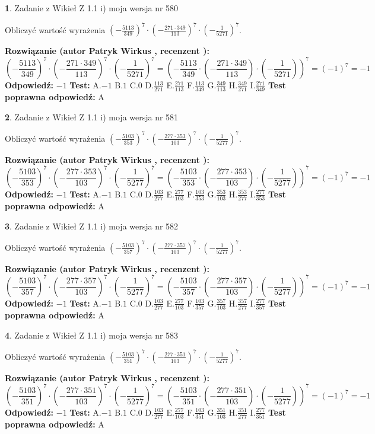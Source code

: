\documentclass[12pt, a4paper]{article}
\theoremstyle{definition} %
\newtheorem{zad}{}
\newcommand{\zadStart}[1]{\begin{zad}#1\newline}
\newcommand{\zadStop}{\end{zad}}
\newcommand{\rozwStart}[2]{\noindent \textbf{Rozwiązanie (autor #1 , recenzent #2): }\newline}
\newcommand{\rozwStop}{\newline}
\newcommand{\odpStart}{\noindent \textbf{Odpowiedź:}\newline}
\newcommand{\odpStop}{\newline}
\newcommand{\testStart}{\noindent \textbf{Test:}\newline}
\newcommand{\testStop}{\newline}
\newcommand{\kluczStart}{\noindent \textbf{Test poprawna odpowiedź:}\newline}
\newcommand{\kluczStop}{\newline}
\begin{document}
\zadStart{Zadanie z Wikieł Z 1.1 i) moja wersja nr 580}

Obliczyć wartość wyrażenia $(-\frac{5113}{349})^{7} \cdot (-\frac{271 \cdot 349}{113})^{7} \cdot (-\frac{1}{5271})^{7}$.
\zadStop
\rozwStart{Patryk Wirkus}{}
$$(-\frac{5113}{349})^{7} \cdot (-\frac{271 \cdot 349}{113})^{7} \cdot (-\frac{1}{5271})^{7} = (-\frac{5113}{349} \cdot (-\frac{271 \cdot 349}{113}) \cdot (-\frac{1}{5271}))^{7} = (-1)^{7} = -1$$
\rozwStop
\odpStart
$-1$
\odpStop
\testStart
A.$-1$ B.$1$ C.$0$ D.$\frac{113}{271}$ E.$\frac{271}{113}$
F.$\frac{113}{349}$ G.$\frac{349}{113}$
H.$\frac{349}{271}$
I.$\frac{271}{349}$
\testStop
\kluczStart
A
\kluczStop



\zadStart{Zadanie z Wikieł Z 1.1 i) moja wersja nr 581}

Obliczyć wartość wyrażenia $(-\frac{5103}{353})^{7} \cdot (-\frac{277 \cdot 353}{103})^{7} \cdot (-\frac{1}{5277})^{7}$.
\zadStop
\rozwStart{Patryk Wirkus}{}
$$(-\frac{5103}{353})^{7} \cdot (-\frac{277 \cdot 353}{103})^{7} \cdot (-\frac{1}{5277})^{7} = (-\frac{5103}{353} \cdot (-\frac{277 \cdot 353}{103}) \cdot (-\frac{1}{5277}))^{7} = (-1)^{7} = -1$$
\rozwStop
\odpStart
$-1$
\odpStop
\testStart
A.$-1$ B.$1$ C.$0$ D.$\frac{103}{277}$ E.$\frac{277}{103}$
F.$\frac{103}{353}$ G.$\frac{353}{103}$
H.$\frac{353}{277}$
I.$\frac{277}{353}$
\testStop
\kluczStart
A
\kluczStop



\zadStart{Zadanie z Wikieł Z 1.1 i) moja wersja nr 582}

Obliczyć wartość wyrażenia $(-\frac{5103}{357})^{7} \cdot (-\frac{277 \cdot 357}{103})^{7} \cdot (-\frac{1}{5277})^{7}$.
\zadStop
\rozwStart{Patryk Wirkus}{}
$$(-\frac{5103}{357})^{7} \cdot (-\frac{277 \cdot 357}{103})^{7} \cdot (-\frac{1}{5277})^{7} = (-\frac{5103}{357} \cdot (-\frac{277 \cdot 357}{103}) \cdot (-\frac{1}{5277}))^{7} = (-1)^{7} = -1$$
\rozwStop
\odpStart
$-1$
\odpStop
\testStart
A.$-1$ B.$1$ C.$0$ D.$\frac{103}{277}$ E.$\frac{277}{103}$
F.$\frac{103}{357}$ G.$\frac{357}{103}$
H.$\frac{357}{277}$
I.$\frac{277}{357}$
\testStop
\kluczStart
A
\kluczStop



\zadStart{Zadanie z Wikieł Z 1.1 i) moja wersja nr 583}

Obliczyć wartość wyrażenia $(-\frac{5103}{351})^{7} \cdot (-\frac{277 \cdot 351}{103})^{7} \cdot (-\frac{1}{5277})^{7}$.
\zadStop
\rozwStart{Patryk Wirkus}{}
$$(-\frac{5103}{351})^{7} \cdot (-\frac{277 \cdot 351}{103})^{7} \cdot (-\frac{1}{5277})^{7} = (-\frac{5103}{351} \cdot (-\frac{277 \cdot 351}{103}) \cdot (-\frac{1}{5277}))^{7} = (-1)^{7} = -1$$
\rozwStop
\odpStart
$-1$
\odpStop
\testStart
A.$-1$ B.$1$ C.$0$ D.$\frac{103}{277}$ E.$\frac{277}{103}$
F.$\frac{103}{351}$ G.$\frac{351}{103}$
H.$\frac{351}{277}$
I.$\frac{277}{351}$
\testStop
\kluczStart
A
\kluczStop
\end{document}
